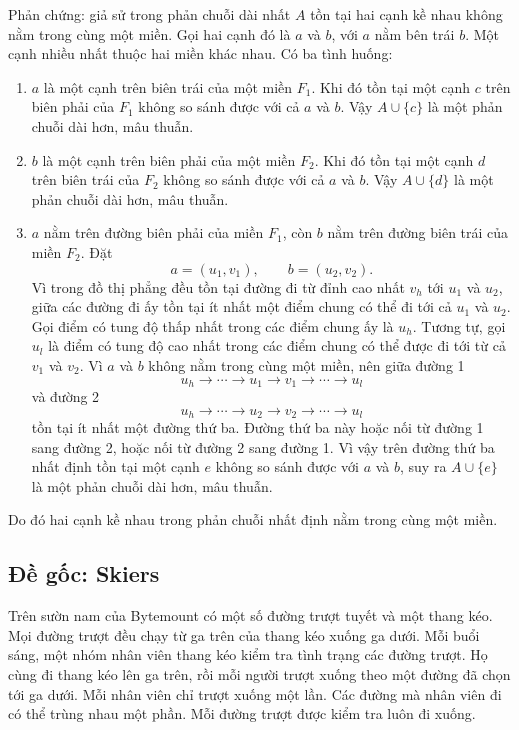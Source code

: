 \documentclass[11pt]{article}
\begin{document}
Phản chứng: giả sử trong phản chuỗi dài nhất \(A\) tồn tại hai cạnh kề nhau
không nằm trong cùng một miền. Gọi hai cạnh đó là \(a\) và \(b\), với \(a\) nằm
bên trái \(b\). Một cạnh nhiều nhất thuộc hai miền khác nhau. Có ba tình huống:
\begin{enumerate}
  \item \(a\) là một cạnh trên biên trái của một miền \(F_1\). Khi đó tồn tại
  một cạnh \(c\) trên biên phải của \(F_1\) không so sánh được với cả \(a\) và
  \(b\). Vậy \(A\cup\{c\}\) là một phản chuỗi dài hơn, mâu thuẫn.
  \item \(b\) là một cạnh trên biên phải của một miền \(F_2\). Khi đó tồn tại
  một cạnh \(d\) trên biên trái của \(F_2\) không so sánh được với cả \(a\) và
  \(b\). Vậy \(A\cup\{d\}\) là một phản chuỗi dài hơn, mâu thuẫn.
  \item \(a\) nằm trên đường biên phải của miền \(F_1\), còn \(b\) nằm trên
  đường biên trái của miền \(F_2\). Đặt
  \[
    a=(u_1,v_1),\qquad b=(u_2,v_2).
  \]
  Vì trong đồ thị phẳng đều tồn tại đường đi từ đỉnh cao nhất \(v_h\) tới
  \(u_1\) và \(u_2\), giữa các đường đi ấy tồn tại ít nhất một điểm chung có
  thể đi tới cả \(u_1\) và \(u_2\). Gọi điểm có tung độ thấp nhất trong các
  điểm chung ấy là \(u_h\). Tương tự, gọi \(u_l\) là điểm có tung độ cao nhất
  trong các điểm chung có thể được đi tới từ cả \(v_1\) và \(v_2\). Vì \(a\) và
  \(b\) không nằm trong cùng một miền, nên giữa đường 1
  \[
    u_h\to\cdots\to u_1\to v_1\to\cdots\to u_l
  \]
  và đường 2
  \[
    u_h\to\cdots\to u_2\to v_2\to\cdots\to u_l
  \]
  tồn tại ít nhất một đường thứ ba. Đường thứ ba này hoặc nối từ đường 1 sang
  đường 2, hoặc nối từ đường 2 sang đường 1. Vì vậy trên đường thứ ba nhất
  định tồn tại một cạnh \(e\) không so sánh được với \(a\) và \(b\), suy ra
  \(A\cup\{e\}\) là một phản chuỗi dài hơn, mâu thuẫn.
\end{enumerate}
Do đó hai cạnh kề nhau trong phản chuỗi nhất định nằm trong cùng một miền.

\subsection{Đề gốc: Skiers}

Trên sườn nam của Bytemount có một số đường trượt tuyết và một thang kéo. Mọi
đường trượt đều chạy từ ga trên của thang kéo xuống ga dưới. Mỗi buổi sáng,
một nhóm nhân viên thang kéo kiểm tra tình trạng các đường trượt. Họ cùng đi
thang kéo lên ga trên, rồi mỗi người trượt xuống theo một đường đã chọn tới ga
dưới. Mỗi nhân viên chỉ trượt xuống một lần. Các đường mà nhân viên đi có thể
trùng nhau một phần. Mỗi đường trượt được kiểm tra luôn đi xuống.
\end{document}
